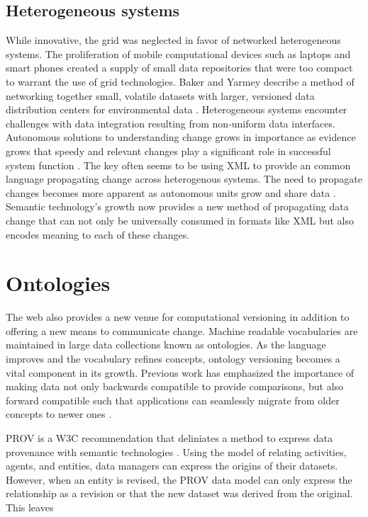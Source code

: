 \subsection{Heterogeneous systems}
While innovative, the grid was neglected in favor of networked heterogeneous systems.
The proliferation of mobile computational devices such as laptops and smart phones created a supply of small data repositories that were too compact to warrant the use of grid technologies.
Baker and Yarmey describe a method of networking together small, volatile datasets with larger, versioned data distribution centers for environmental data \cite{Baker2009}.
Heterogeneous systems encounter challenges with data integration resulting from non-uniform data interfaces.
Autonomous solutions to understanding change grows in importance as evidence grows that speedy and relevant changes play a significant role in successful system function \cite{Bouzeghoub:2004:FAD:1012453.1012464}.
The key often seems to be using XML to provide an common language propagating change across heterogenous systems.
The need to propagate changes becomes more apparent as autonomous units grow and share data \cite{Systems02champagne:data}.
Semantic technology's growth now provides a new method of propagating data change that can not only be universally consumed in formats like XML but also encodes meaning to each of these changes.

\section{Ontologies}
The web also provides a new venue for computational versioning in addition to offering a new means to communicate change.
Machine readable vocabularies are maintained in large data collections known as ontologies.
As the language improves and the vocabulary refines concepts, ontology versioning becomes a vital component in its growth.
Previous work has emphasized the importance of making data not only backwards compatible to provide comparisons, but also forward compatible such that applications can seamlessly migrate from older concepts to newer ones \cite{Klein01ontologyversioning}.

PROV is a W3C recommendation that deliniates a method to express data provenance with semantic technologies \cite{Belhajjame2013}.
Using the model of relating activities, agents, and entities, data managers can express the origins of their datasets.
However, when an entity is revised, the PROV data model can only express the relationship as a revision or that the new dataset was derived from the original.
This leaves



